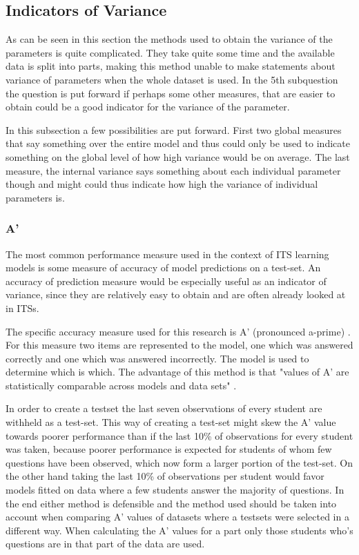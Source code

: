 \documentclass{scrartcl}
\begin{document}
\subsection{Indicators of Variance}
\label{sec:perf}
As can be seen in this section the methods used to obtain the variance of the parameters is quite complicated. They take quite some time and the available data is split into parts, making this method unable to make statements about variance of parameters when the whole dataset is used. In the 5th subquestion the question is put forward if perhaps some other measures, that are easier to obtain could be a good indicator for the variance of the parameter.

In this subsection a few possibilities are put forward. First two global measures that say something over the entire model and thus could only be used to indicate something on the global level of how high variance would be on average. The last measure, the internal variance says something about each individual parameter though and might could thus indicate how high the variance of individual parameters is.

\subsubsection{A'}
The most common performance measure used in the context of ITS learning models is some measure of accuracy of model predictions on a test-set. An accuracy of prediction measure would be especially useful as an indicator of variance, since they are relatively easy to obtain and are often already looked at in ITSs. 

The specific accuracy measure used for this research is A' (pronounced a-prime) \cite{modelreview}. For this measure two items are represented to the model, one which was answered correctly and one which was answered incorrectly. The model is used to determine which is which. The advantage of this method is that "values of A' are statistically comparable across models and data sets" \cite{modelreview}.

In order to create a testset the last seven observations of every student are withheld as a test-set. This way of creating a test-set might skew the A' value towards poorer performance than if the last 10\% of observations for every student was taken, because poorer performance is expected for students of whom few questions have been observed, which now form a larger portion of the test-set. On the other hand taking the last 10\% of observations per student would favor models fitted on data where a few students answer the majority of questions. In the end either method is defensible and the method used should be taken into account when comparing A' values of datasets where a testsets were selected in a different way. When calculating the A' values for a part only those students who's questions are in that part of the data are used.
\end{document}
